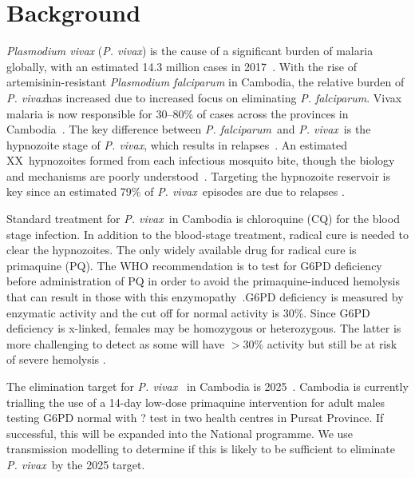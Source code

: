 \documentclass[doublespacing]{bmcart}
\newcommand{\pv}{\textit{P. vivax}}
\newcommand{\pf}{\textit{P. falciparum}}
\begin{document}

\section*{Background} 

\textit{Plasmodium vivax} (\pv) is the cause of a significant burden of malaria globally, with an estimated 14.3 million cases in 2017~\cite{Battle2019}. With the rise of artemisinin-resistant \textit{Plasmodium falciparum} in Cambodia, the relative burden of \pv has increased due to increased focus on eliminating \pf. Vivax malaria is now responsible for 30--80\% of cases across the provinces in Cambodia~\cite{Pengby}. The key difference between \pf~and \pv~is the hypnozoite stage of \pv, which results in relapses~\cite{biologyofvivax}. An estimated XX~hypnozoites formed from each infectious mosquito bite, though the biology and mechanisms are poorly understood~\cite{vivaxbiology}. Targeting the hypnozoite reservoir is key since an estimated 79\% of \pv~episodes are due to relapses \cite{Commons2020}.   

Standard treatment for \pv~in Cambodia is chloroquine (CQ) for the blood stage infection. In addition to the blood-stage treatment, radical cure is needed to clear the hypnozoites. The only widely available drug for radical cure is primaquine (PQ). The WHO recommendation is to test for G6PD deficiency before administration of PQ in order to avoid the primaquine-induced hemolysis that can result in those with this enzymopathy~\cite{WHO2015malaria}.G6PD deficiency is measured by enzymatic activity and the cut off for normal activity is 30\%. Since G6PD deficiency is x-linked, females may be homozygous or heterozygous. The latter is more challenging to detect as some will have $>$30\% activity but still be at risk of severe hemolysis \cite{Chu2017}. 

The elimination target for \pv~  in Cambodia is 2025~\cite{Cambodia}. Cambodia is currently trialling the use of a 14-day low-dose primaquine intervention for adult males testing G6PD normal with ? test in two health centres in Pursat Province. If successful, this will be expanded into the National programme. We use transmission modelling to determine if this is likely to be sufficient to eliminate \pv~by the 2025 target. 
\end{document}
